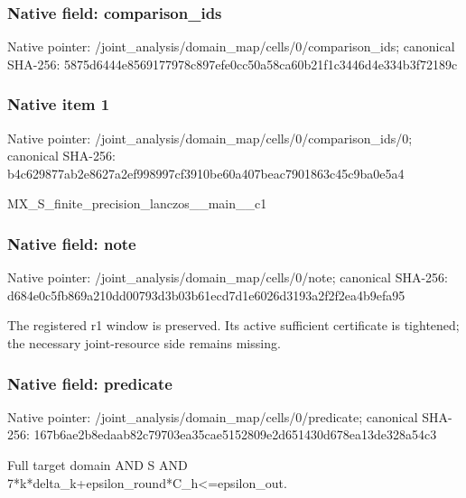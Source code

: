\documentclass[10pt,a4paper]{article}
\begin{document}
\subsubsection{Native field: comparison\_\allowbreak{}ids}
Native pointer: /joint\_\allowbreak{}analysis/domain\_\allowbreak{}map/cells/0/comparison\_\allowbreak{}ids; canonical SHA-256: 5875d6444e8569177978c897efe0cc50a58ca60b21f1c3446d4e334b3f72189c

\subsubsection{Native item 1}
Native pointer: /joint\_\allowbreak{}analysis/domain\_\allowbreak{}map/cells/0/comparison\_\allowbreak{}ids/0; canonical SHA-256: b4c629877ab2e8627a2ef998997cf3910be60a407beac7901863c45c9ba0e5a4

\begingroup\raggedright\sloppy MX\_\allowbreak{}S\_\allowbreak{}finite\_\allowbreak{}precision\_\allowbreak{}lanczos\_\allowbreak{}\_\allowbreak{}main\_\allowbreak{}\_\allowbreak{}c1\par\endgroup

\subsubsection{Native field: note}
Native pointer: /joint\_\allowbreak{}analysis/domain\_\allowbreak{}map/cells/0/note; canonical SHA-256: d684e0c5fb869a210dd00793d3b03b61ecd7d1e6026d3193a2f2f2ea4b9efa95

\begingroup\raggedright\sloppy The registered r1 window is preserved. Its active sufficient certificate is tightened;\allowbreak{} the necessary joint-resource side remains missing.\par\endgroup

\subsubsection{Native field: predicate}
Native pointer: /joint\_\allowbreak{}analysis/domain\_\allowbreak{}map/cells/0/predicate; canonical SHA-256: 167b6ae2b8edaab82c79703ea35cae5152809e2d651430d678ea13de328a54c3

\begingroup\raggedright\sloppy Full target domain AND S AND 7*k*delta\_\allowbreak{}k+epsilon\_\allowbreak{}round*C\_\allowbreak{}h<=\allowbreak{}epsilon\_\allowbreak{}out.\par\endgroup
\end{document}
